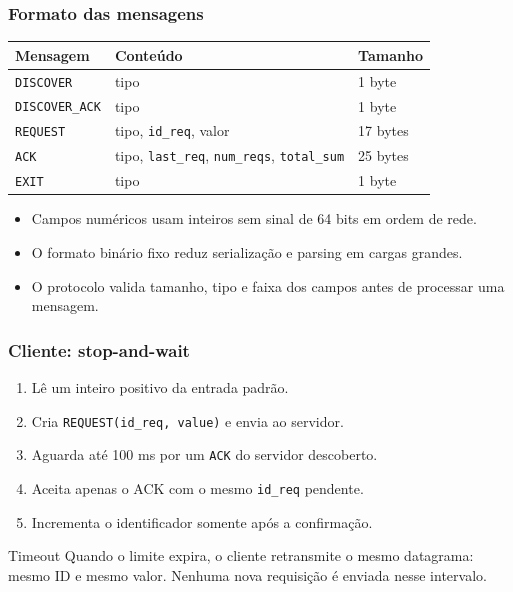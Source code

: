 \documentclass{beamer}
\begin{document}
\begin{frame}
  \frametitle{Formato das mensagens}
  \small
  \begin{center}
    \begin{tabular}{@{}lll@{}}
      \toprule
      Mensagem & Conteúdo & Tamanho \\
      \midrule
      \texttt{DISCOVER} & tipo & 1 byte \\
      \texttt{DISCOVER\_ACK} & tipo & 1 byte \\
      \texttt{REQUEST} & tipo, \texttt{id\_req}, valor & 17 bytes \\
      \texttt{ACK} & tipo, \texttt{last\_req}, \texttt{num\_reqs}, \texttt{total\_sum} & 25 bytes \\
      \texttt{EXIT} & tipo & 1 byte \\
      \bottomrule
    \end{tabular}
  \end{center}

  \vspace{1em}
  \begin{itemize}
    \item Campos numéricos usam inteiros sem sinal de 64 bits em ordem de rede.
    \item O formato binário fixo reduz serialização e parsing em cargas grandes.
    \item O protocolo valida tamanho, tipo e faixa dos campos antes de processar uma mensagem.
  \end{itemize}
\end{frame}

\begin{frame}
  \frametitle{Cliente: stop-and-wait}
  \begin{enumerate}
    \item Lê um inteiro positivo da entrada padrão.
    \item Cria \texttt{REQUEST(id\_req, value)} e envia ao servidor.
    \item Aguarda até 100 ms por um \texttt{ACK} do servidor descoberto.
    \item Aceita apenas o ACK com o mesmo \texttt{id\_req} pendente.
    \item Incrementa o identificador somente após a confirmação.
  \end{enumerate}

  \vspace{1em}
  \begin{alertblock}{Timeout}
    Quando o limite expira, o cliente retransmite o mesmo datagrama: mesmo ID e mesmo valor. Nenhuma nova requisição é enviada nesse intervalo.
  \end{alertblock}
\end{frame}
\end{document}
